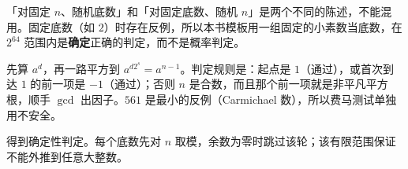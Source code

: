 \documentclass[UTF8,a4paper,11pt,oneside,openany,fontset=fandol]{ctexbook}
\theoremstyle{definition}
\begin{document}
\begin{tip}
「对固定 $n$、随机底数」和「对固定底数、随机 $n$」是两个不同的陈述，不能混用。固定底数（如 $2$）时存在反例，所以本书模板用一组固定的小素数当底数，在 $2^{64}$ 范围内是\textbf{确定}正确的判定，而不是概率判定。
\end{tip}

\begin{tip}[读一条测试链的方法]
先算 $a^d$，再一路平方到 $a^{d2^s}=a^{n-1}$。判定规则是：起点是 $1$（通过），或首次到达 $1$ 的前一项是 $-1$（通过）；否则 $n$ 是合数，而且那个前一项就是非平凡平方根，顺手 $\gcd$ 出因子。$561$ 是最小的反例（Carmichael 数），所以费马测试单独用不安全。
\end{tip}

得到确定性判定。每个底数先对 $n$ 取模，余数为零时跳过该轮；该有限范围保证不能外推到任意大整数。
\end{document}
